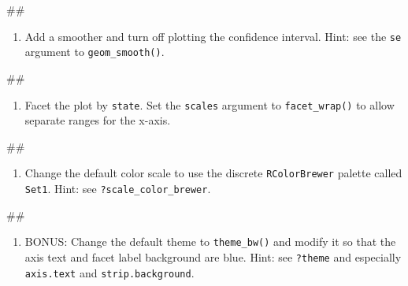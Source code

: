 \documentclass[]{book}
\newenvironment{Shaded}{\begin{snugshade}}{\end{snugshade}}
\newcommand{\NormalTok}[1]{#1}
\providecommand{\tightlist}{%
  \setlength{\itemsep}{0pt}\setlength{\parskip}{0pt}}
\begin{document}
\begin{Shaded}
\begin{Highlighting}[]
\NormalTok{## }
\end{Highlighting}
\end{Shaded}

\begin{enumerate}
\def\labelenumi{\arabic{enumi}.}
\setcounter{enumi}{2}
\tightlist
\item
  Add a smoother and turn off plotting the confidence interval. Hint:
  see the \texttt{se} argument to \texttt{geom\_smooth()}.
\end{enumerate}

\begin{Shaded}
\begin{Highlighting}[]
\NormalTok{## }
\end{Highlighting}
\end{Shaded}

\begin{enumerate}
\def\labelenumi{\arabic{enumi}.}
\setcounter{enumi}{3}
\tightlist
\item
  Facet the plot by \texttt{state}. Set the \texttt{scales} argument to
  \texttt{facet\_wrap()} to allow separate ranges for the x-axis.
\end{enumerate}

\begin{Shaded}
\begin{Highlighting}[]
\NormalTok{## }
\end{Highlighting}
\end{Shaded}

\begin{enumerate}
\def\labelenumi{\arabic{enumi}.}
\setcounter{enumi}{4}
\tightlist
\item
  Change the default color scale to use the discrete
  \texttt{RColorBrewer} palette called \texttt{Set1}. Hint: see
  \texttt{?scale\_color\_brewer}.
\end{enumerate}

\begin{Shaded}
\begin{Highlighting}[]
\NormalTok{## }
\end{Highlighting}
\end{Shaded}

\begin{enumerate}
\def\labelenumi{\arabic{enumi}.}
\setcounter{enumi}{5}
\tightlist
\item
  BONUS: Change the default theme to \texttt{theme\_bw()} and modify it
  so that the axis text and facet label background are blue. Hint: see
  \texttt{?theme} and especially \texttt{axis.text} and
  \texttt{strip.background}.
\end{enumerate}
\end{document}
